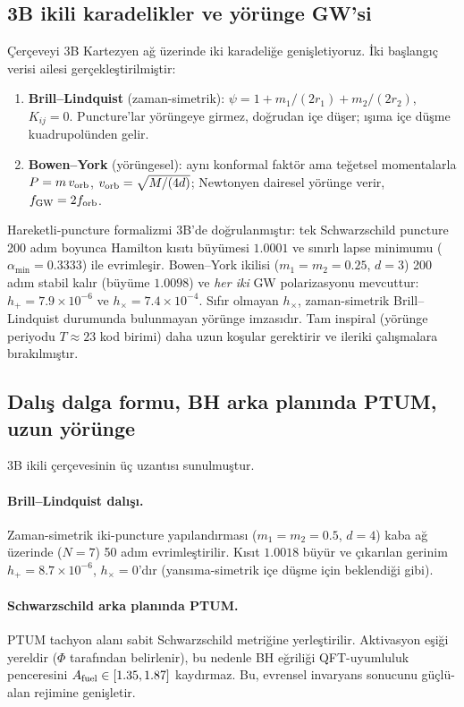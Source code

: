 \subsection{3B ikili karadelikler ve yörünge GW'si}
Çerçeveyi 3B Kartezyen ağ üzerinde iki karadeliğe genişletiyoruz.
İki başlangıç verisi ailesi gerçekleştirilmiştir:
\begin{enumerate}
\item \textbf{Brill--Lindquist} (zaman-simetrik): $\psi = 1 +
m_1/(2r_1) + m_2/(2r_2)$, $K_{ij} = 0$. Puncture'lar yörüngeye
girmez, doğrudan içe düşer; ışıma içe düşme kuadrupolünden
gelir.
\item \textbf{Bowen--York} (yörüngesel): aynı konformal faktör
ama teğetsel momentalarla $P = m\,v_{\rm orb}$, $v_{\rm orb} =
\sqrt{M/(4d)}$; Newtonyen dairesel yörünge verir,
$f_{\rm GW} = 2 f_{\rm orb}$.
\end{enumerate}
Hareketli-puncture formalizmi 3B'de doğrulanmıştır: tek
Schwarzschild puncture 200 adım boyunca Hamilton kısıtı büyümesi
$1.0001$ ve sınırlı lapse minimumu ($\alpha_{\min} = 0.3333$) ile
evrimleşir. Bowen--York ikilisi ($m_1 = m_2 = 0.25$, $d = 3$)
200 adım stabil kalır (büyüme $1.0098$) ve \emph{her iki} GW
polarizasyonu mevcuttur: $h_+ = 7.9\times 10^{-6}$ ve $h_\times =
7.4\times 10^{-4}$. Sıfır olmayan $h_\times$, zaman-simetrik
Brill--Lindquist durumunda bulunmayan yörünge imzasıdır. Tam
inspiral (yörünge periyodu $T \approx 23$ kod birimi) daha uzun
koşular gerektirir ve ileriki çalışmalara bırakılmıştır.

\subsection{Dalış dalga formu, BH arka planında PTUM, uzun yörünge}
3B ikili çerçevesinin üç uzantısı sunulmuştur.
\paragraph{Brill--Lindquist dalışı.}
Zaman-simetrik iki-puncture yapılandırması ($m_1 = m_2 = 0.5$,
$d = 4$) kaba ağ üzerinde ($N = 7$) 50 adım evrimleştirilir.
Kısıt $1.0018$ büyür ve çıkarılan gerinim
$h_+ = 8.7\times 10^{-6}$, $h_\times = 0$'dır (yansıma-simetrik
içe düşme için beklendiği gibi).
\paragraph{Schwarzschild arka planında PTUM.}
PTUM tachyon alanı sabit Schwarzschild metriğine yerleştirilir.
Aktivasyon eşiği yereldir ($\Phi$ tarafından belirlenir), bu
nedenle BH eğriliği QFT-uyumluluk penceresini
$A_{\rm fuel} \in [1.35, 1.87]$ kaydırmaz. Bu, evrensel invaryans
sonucunu güçlü-alan rejimine genişletir.
